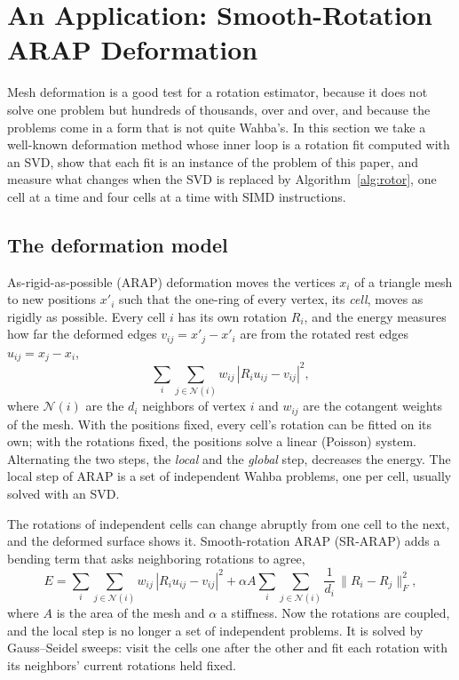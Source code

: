 \documentclass{birkjour}
\theoremstyle{definition}
\theoremstyle{remark}
\numberwithin{equation}{section}
\begin{document}
\section{An Application: Smooth-Rotation ARAP Deformation}
\label{section:application}

Mesh deformation is a good test for a rotation estimator, because it does not solve one problem but hundreds of thousands, over and over, and because the problems come in a form that is not quite Wahba's. In this section we take a well-known deformation method whose inner loop is a rotation fit computed with an SVD, show that each fit is an instance of the problem of this paper, and measure what changes when the SVD is replaced by Algorithm~\ref{alg:rotor}, one cell at a time and four cells at a time with SIMD instructions.

\subsection{The deformation model}

As-rigid-as-possible (ARAP) deformation \cite{Sorkine2007} moves the vertices $x_i$ of a triangle mesh to new positions $x'_i$ such that the one-ring of every vertex, its \emph{cell}, moves as rigidly as possible. Every cell $i$ has its own rotation $R_i$, and the energy measures how far the deformed edges $v_{ij} = x'_j - x'_i$ are from the rotated rest edges $u_{ij} = x_j - x_i$,
\begin{equation}
\sum_i \sum_{j \in \mathcal N(i)} w_{ij}\, |R_i u_{ij} - v_{ij}|^2,
\end{equation}
where $\mathcal N(i)$ are the $d_i$ neighbors of vertex $i$ and $w_{ij}$ are the cotangent weights of the mesh. With the positions fixed, every cell's rotation can be fitted on its own; with the rotations fixed, the positions solve a linear (Poisson) system. Alternating the two steps, the \emph{local} and the \emph{global} step, decreases the energy. The local step of ARAP is a set of independent Wahba problems, one per cell, usually solved with an SVD.

The rotations of independent cells can change abruptly from one cell to the next, and the deformed surface shows it. Smooth-rotation ARAP (SR-ARAP) \cite{Levi2015} adds a bending term that asks neighboring rotations to agree,
\begin{equation}
\label{eqn:srarap}
E = \sum_i \sum_{j \in \mathcal N(i)} w_{ij}\, |R_i u_{ij} - v_{ij}|^2 + \alpha A \sum_i \sum_{j \in \mathcal N(i)} \frac{1}{d_i}\, \| R_i - R_j \|_F^2,
\end{equation}
where $A$ is the area of the mesh and $\alpha$ a stiffness. Now the rotations are coupled, and the local step is no longer a set of independent problems. It is solved by Gauss--Seidel sweeps: visit the cells one after the other and fit each rotation with its neighbors' current rotations held fixed.
\end{document}
